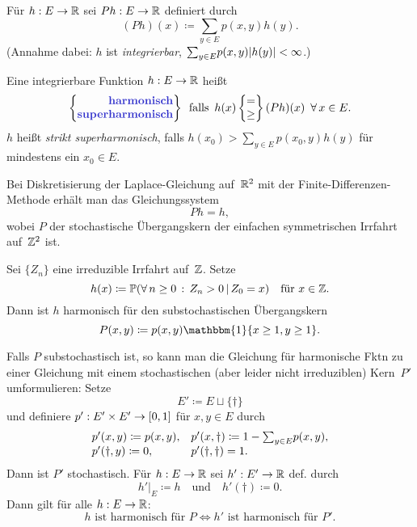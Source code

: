 \documentclass{cheat-sheet}
\renewcommand{\P}{\mathbb{P}} %
\newcommand{\ind}{\mathbbm{1}} %
\begin{document}
\begin{nota}
  Für $h : E \to \mathbb{R}$ sei $P h : E \to \mathbb{R}$ definiert durch
  \[
    (P h)(x) \coloneqq {\sum}_{y \in E} p(x, y) h(y).
  \]
  (Annahme dabei: $h$ ist \textit{integrierbar}, \dh{} ${\sum}_{y \in E} p(x, y) \abs{h(y)} < \infty$.) \\
\end{nota}

\begin{defn}
  Eine integrierbare Funktion $h : E \to \mathbb{R}$ heißt
  \[
    \arraycolsep=0pt
    \left\{ \begin{array}{r}
      \text{\emph{harmonisch}} \\
      \text{\emph{superharmonisch}}
    \end{array} \right\}
    \enspace \text{falls} \enspace
    h(x)
    \left\{ \begin{array}{c}
      = \\
      \geq
    \end{array} \right\}
    (P h)(x)
    \enspace \forall \, x \in E.
  \]
  $h$ heißt \textit{strikt superharmonisch}, falls $h(x_0) > {\sum}_{y \in E} p(x_0, y) h(y)$ für mindestens ein $x_0 \in E$.
\end{defn}

\begin{bsp}
  Bei Diskretisierung der Laplace-Gleichung auf~$\mathbb{R}^2$ mit der Finite-Differenzen-Methode erhält man das Gleichungssystem
  \[ P h = h, \]
  wobei $P$ der stochastische Übergangskern der einfachen symmetrischen Irrfahrt auf~$\mathbb{Z}^2$ ist.
\end{bsp}

\begin{bsp}
  Sei $\{ Z_n \}$ eine irreduzible Irrfahrt auf~$\mathbb{Z}$.
  Setze
  \[
    h(x) \coloneqq \P(\fa{n \geq 0} Z_n > 0 \,|\, Z_0 = x)
    \quad \text{für } x \in \Z.
  \]
  Dann ist $h$ harmonisch für den substochastischen Übergangskern
  \[
    P(x, y) \coloneqq p(x, y) \ind \{ x \geq 1, y \geq 1 \}.
  \]
\end{bsp}

\begin{verf}
  Falls $P$ substochastisch ist, so kann man die Gleichung für harmonische Fktn zu einer Gleichung mit einem stochastischen (aber leider nicht irreduziblen) Kern~$P'$ umformulieren: Setze
  \[ E' \coloneqq E \sqcup \{ \dag \} \]
  und definiere $p' : E' \times E' \to \left[ 0, 1 \right]$ für $x, y \in E$ durch
  \[
    \begin{array}{l l}
      p'(x, y) \coloneqq p(x, y),
      & p'(x, \dag) \coloneqq 1 - {\sum}_{y \in E} p(x, y), \\
      p'(\dag, y) \coloneqq 0,
      & p'(\dag, \dag) = 1.
    \end{array}
  \]
  Dann ist $P'$ stochastisch.
  Für $h : E \to \mathbb{R}$ sei $h' : E' \to \mathbb{R}$ def. durch
  \[
    h'|_E \coloneqq h
    \quad \text{und} \quad
    h'(\dag) \coloneqq 0.
  \]
  Dann gilt für alle $h : E \to \mathbb{R}$:
  \[
    \text{$h$ ist harmonisch für $P$} \iff
    \text{$h'$ ist harmonisch für $P'$.}
  \]
\end{verf}
\end{document}
